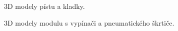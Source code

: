 \documentclass[12pt, a4paper,
twoside,        %
openright
]{report}
\begin{document}
\begin{figure}[H]
	\centering
	\qquad
	\caption{3D modely pístu a kladky.}
	\label{fig:soucastky}
\end{figure}

\begin{figure}[H]
	\centering
	\qquad
	\caption{3D modely modulu s vypínači a pneumatického škrtiče.}
	\label{fig:soucastky2}
\end{figure}

\newpage
\end{document}

